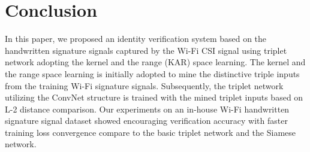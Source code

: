 \documentclass[runningheads]{llncs}
\begin{document}
\section{Conclusion}
In this paper, we proposed an identity verification system based on the handwritten signature signals captured by the Wi-Fi CSI signal using triplet network adopting the kernel and the range (KAR) space learning. 
The kernel and the range space learning is initially adopted to mine the distinctive triple inputs from the training Wi-Fi signature signals. 
Subsequently, the triplet network utilizing the ConvNet structure is trained with the mined triplet inputs based on L-2 distance comparison. 
Our experiments on an in-house Wi-Fi handwritten signature signal dataset showed encouraging verification accuracy with faster training loss convergence compare to the basic triplet network and the Siamese network.
%
%
%
%
%
%






\end{document}
